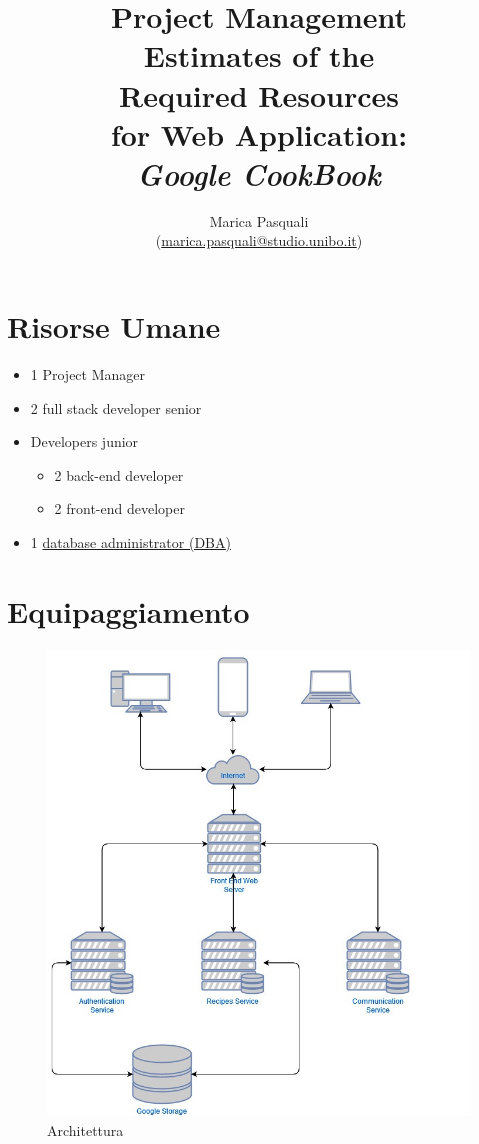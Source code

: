 \documentclass{article}
\title{
    Project Management \\
    \textbf{ 
        Estimates of the \\ 
        Required Resources \\ 
        for Web Application: \\
        \textit{Google CookBook}
    }
}
\author{
    Marica Pasquali \\ 
    (\href{mailto:marica.pasquali@studio.unibo.it}{marica.pasquali@studio.unibo.it})
}
\begin{document}
\maketitle
\newpage \tableofcontents \newpage

\section{Risorse Umane}

\begin{itemize}
    \item 1 Project Manager 
    \item 2 full stack developer senior 
    \item Developers junior
    \begin{itemize}
        \item 2 back-end developer
        \item 2 front-end developer
    \end{itemize} 
    \item 1 \href{https://en.wikipedia.org/wiki/Database_administrator}{database administrator (DBA)} 
\end{itemize}


\section{Equipaggiamento}


\begin{figure}[htbp]
    \centering
    \includegraphics[scale=0.7]{./imgs/pm-architecture.jpg}
    \caption{Architettura}
\end{figure}
\end{document}
